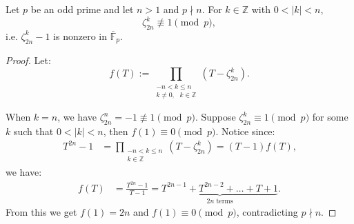 \documentclass[10pt,a4paper]{amsart}
\newcommand{\bF}{\mathbb{F}}
\begin{document}
\begin{lemma} \label{distinct}
Let $p$ be an odd prime and let $n > 1$ and $p \nmid n$. For $k \in \mathbb{Z}$ with $0 < |k| < n$,
$$\zeta_{2n}^k \not \equiv 1 \pmod p,$$
i.e. $\zeta_{2n}^k - 1$ is nonzero in $\overline{\bF}_p$.
\end{lemma}

\begin{proof}
Let:
$$f(T) := \prod_{\substack{-n < k \leq n \\ k \neq 0, \text{ } k \in \mathbb{Z}}} (T - \zeta_{2n}^k) \text{.}$$

When $k = n$, we have $\zeta_{2n}^n = -1 \not \equiv 1 \pmod p$. Suppose $\zeta_{2n}^k \equiv 1 \pmod p$ for some $k$ such that $0 < |k| < n$, then $f(1)\equiv 0\pmod p$.
Notice since:
    \begin{align*}
        T^{2n}-1 &= \prod_{\substack{-n < k \le n \\ k \in \mathbb{Z}}}(T-\zeta_{2n}^k)
        = (T - 1) f(T) \text{,}
    \end{align*}
we have:
\begin{align*}
    f(T) &= \frac{T^{2n} - 1}{T - 1} = \underbrace{T^{2n - 1} + T^{2n - 2} + \dots + T + 1}_{2n \text{ terms}} \text{.}
\end{align*}
From this we get $f(1) = 2n$ and $f(1) \equiv 0 \pmod{p}$, contradicting $p \nmid n$.
\end{proof}
\end{document}
